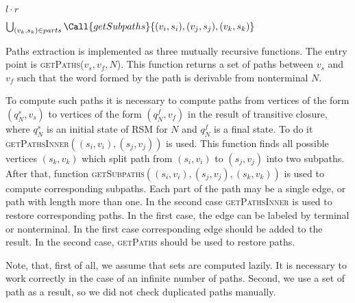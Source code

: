 \begin{algorithm}[h]
\begin{algorithmic}[1]
    \State \Return $l \cdot r$
\EndFunction

    \State \Return $\bigcup_{(v_k,s_k) \in parts} \Call{getSubpaths}{(v_i,s_i), (v_j,s_j),(v_k,s_k)}$
\EndFunction
\end{algorithmic}
\end{algorithm}

Paths extraction is implemented as three mutually recursive functions.
The entry point is \textsc{getPaths}($v_s, v_f, N$). 
This function returns a set of paths between $v_s$ and $v_f$ such that the word formed by the path is derivable from nonterminal $N$.

To compute such paths it is necessary to compute paths from vertices of the form $(q_N^s,v_s)$ to vertices of the form $(q_N^f, v_f)$ in the result of transitive closure, where $q_N^s$ is an initial state of RSM for $N$ and $q_N^f$ is a final state.
To do it \textsc{getPathsInner}$((s_i,v_i),(s_j,v_j))$ is used. 
This function finds all possible vertices $(s_k,v_k)$  which split path from $(s_i,v_i)$ to $(s_j,v_j)$ into two subpaths.
After that, function \textsc{getSubpaths}$((s_i,v_i),(s_j,v_j),(s_k,v_k))$ is used to compute corresponding subpaths.
Each part of the path may be a single edge, or path with length more than one. 
In the second case \textsc{getPathsInner} is used to restore corresponding paths.
In the first case, the edge can be labeled by terminal or nonterminal. 
In the first case corresponding edge should be added to the result.
In the second case,  \textsc{getPaths} should be used to restore paths.

Note, that, first of all, we assume that sets are computed lazily.
It is necessary to work correctly in the case of an infinite number of paths.
Second, we use a set of path as a result, so we did not check duplicated paths manually. 
